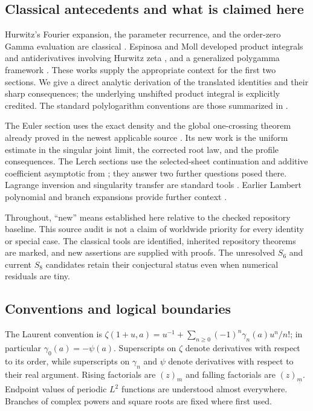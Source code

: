 \documentclass[11pt,a4paper]{article}
\numberwithin{equation}{section}
\theoremstyle{definition}
\theoremstyle{remark}
\begin{document}
\subsection{Classical antecedents and what is claimed here}

Hurwitz's Fourier expansion, the parameter recurrence, and the
order-zero Gamma evaluation are classical \cite{DLMFHurwitz}.
Espinosa and Moll developed product integrals and antiderivatives involving
Hurwitz zeta \cite{EM1,EM2}, and a generalized polygamma framework
\cite{EMPoly}. These works supply the appropriate context for the first
two sections. We give a direct analytic derivation of the translated
identities and their sharp consequences; the underlying unshifted product
integral is explicitly credited. The standard polylogarithm conventions
are those summarized in \cite{DLMFPolylog}.

The Euler section uses the exact density and the global one-crossing
theorem already proved in the newest applicable source \cite{RepoEuler}.
Its new work is the uniform estimate in the singular joint limit, the
corrected root law, and the profile consequences. The Lerch sections use
the selected-sheet continuation and additive coefficient asymptotic from
\cite{RepoLerch}; they answer two further questions posed there. Lagrange
inversion and singularity transfer are standard tools
\cite{Gessel,FlajoletOdlyzko}. Earlier Lambert polynomial and branch
expansions provide further context \cite{KaluginJeffrey,Cohen}.

Throughout, ``new'' means established here relative to the checked
repository baseline. This source audit is not a claim of worldwide
priority for every identity or special case. The classical tools are
identified, inherited repository theorems are marked, and new assertions
are supplied with proofs. The unresolved $S_6$ and current $S_8$ candidates
retain their conjectural status even when numerical residuals are tiny.

\subsection{Conventions and logical boundaries}

The Laurent convention is
$\zeta(1+u,a)=u^{-1}+\sum_{n\geq0}(-1)^n\gamma_n(a)u^n/n!$;
in particular $\gamma_0(a)=-\psi(a)$. Superscripts on $\zeta$ denote
derivatives with respect to its order, while superscripts on
$\gamma_n$ and $\psi$ denote derivatives with respect to their real
argument. Rising factorials are $(z)_m$ and falling factorials are
$(z)_{\underline m}$. Endpoint values of periodic $L^2$ functions are
understood almost everywhere. Branches of complex powers and square
roots are fixed where first used.
\end{document}

